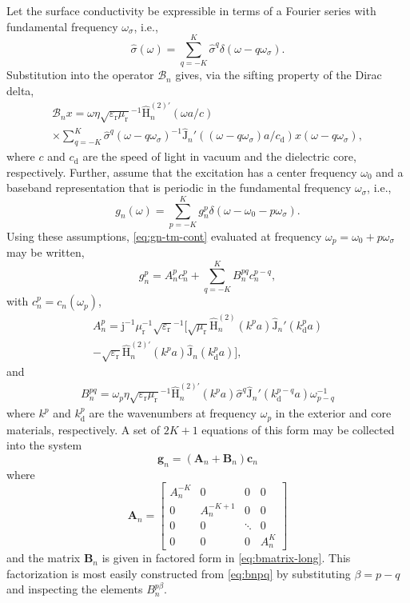 \documentclass[article]{IEEEtran}
\newcommand{\M}[1]{\mathbf{#1}}
\newcommand{\T}[1]{\mathrm{#1}}
\newcommand{\Jh}{\hat{\T{J}}}
\newcommand{\Hh}{\hat{\T{H}}^{(2)}}
\newcommand{\Hhp}{\hat{\T{H}}^{(2)\prime}}
\begin{document}
Let the surface conductivity be expressible in terms of a Fourier series with fundamental frequency $\omega_\sigma$, i.e.,
\begin{equation}
    \hat{\sigma}(\omega) = \sum_{q=-K}^{K}\hat{\sigma}^q\delta(\omega-q\omega_\sigma).
\end{equation}
Substitution into the operator $\mathcal{B}_n$ gives, via the sifting property of the Dirac delta,
\begin{multline}
    \mathcal{B}_n x = \omega\eta\sqrt{\varepsilon_\T{r}\mu_\T{r}}^{-1}\Hhp_n(\omega a/c)\\\times\sum_{q=-K}^{K}\hat{\sigma}^q (\omega-q\omega_\sigma)^{-1}\Jh_n'((\omega-q\omega_\sigma)a/c_\T{d}) x(\omega-q\omega_\sigma),
\end{multline}
where $c$ and $c_\T{d}$ are the speed of light in vacuum and the dielectric core, respectively.  Further, assume that the excitation has a center frequency $\omega_0$ and a baseband representation that is periodic in the fundamental frequency $\omega_\sigma$, i.e.,
\begin{equation}
    g_n(\omega) = \sum_{p = -K}^K g_n^p\delta(\omega-\omega_0-p\omega_\sigma).
\end{equation}
Using these assumptions, \eqref{eq:gn-tm-cont} evaluated at frequency $\omega_p = \omega_0 + p\omega_\sigma$ may be written,
\begin{equation}
    g_n^p = A_n^{p}c_n^p +\sum_{q=-K}^K B_n^{pq}c_n^{p-q},
\end{equation}
with $c_n^p = c_n(\omega_p)$,
\begin{multline}
    A_n^{p} = \T{j}^{-1}\mu_\T{r}^{-1}\sqrt{\varepsilon_\T{r}}^{-1}\biggl[\sqrt{\mu_\T{r}}\Hh_n(k^p a)\Jh_n'(k^p_\T{d}a) \\ -\sqrt{\varepsilon_\T{r}}\Hhp_n(k^p a)\Jh_n(k^p_\T{d}a)\biggr],
    \label{eq:anp}
\end{multline}
and
\begin{multline}
    B_n^{pq} =  \omega_p\eta\sqrt{\varepsilon_\T{r}\mu_\T{r}}^{-1} \Hhp_n(k^p a)\hat{\sigma}^q\Jh_n'(k^{p-q}_\T{d}a)\omega_{p-q}^{-1}
    \label{eq:bnpq}
\end{multline}
where $k^p$ and $k^p_\T{d}$ are the wavenumbers at frequency $\omega_p$ in the exterior and core materials, respectively.  A set of $2K+1$ equations of this form may be collected into the system 
\begin{equation}
    \M{g}_n = \left(\M{A}_n + \M{B}_n\right)\M{c}_n
    \label{eq:g-vector-tm}
\end{equation}
where
\begin{equation}
    \M{A}_n = \begin{bmatrix}
    A_n^{-K} & 0 & 0 & 0 \\
    0 & A_n^{-K+1} & 0 & 0\\
    0 & 0 & \ddots & 0\\
    0 & 0 & 0 & A_n^K
    \end{bmatrix}
\end{equation}
and the matrix $\M{B}_n$ is given in factored form in \eqref{eq:bmatrix-long}.  This factorization is most easily constructed from \eqref{eq:bnpq} by substituting $\beta = p-q$ and inspecting the elements $B_n^{p\beta}$.
\end{document}
